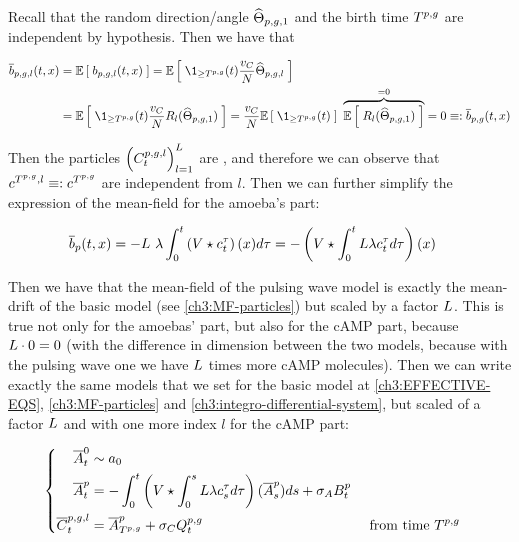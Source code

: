 Recall that the random direction/angle $\widehat{\Theta}_{p,g,1}$ and the birth time $T^{p,g}$ are independent by hypothesis.
Then we have that

\begin{align*}
	\mfdrift_{p,g,l} (t, x)  
	&=
	\E{\drift_{p,g,l} (t, x) }
	= 
	\E{
		\1_{\geq \btime^{p,g}}(t)  \frac{\cdrift}{N}  \cgonia_{p,g,l}
	} 
	\\
	&= 
	\E{
		\1_{\geq \btime^{p,g}}(t)  \frac{\cdrift}{N}  \rotation_l (\cgonia_{p,g,1}) 
	}
	=
	\frac{\cdrift}{N}  
	\E{
			\1_{\geq \btime^{p,g}}(t) 
	}\
	\overbrace{
		\E{ \rotation_l (\cgonia_{p,g,1}) }
	}^{=0} = 0 \equiv: \mfdrift_{p,g} (t, x)  
\end{align*}

Then the particles $\left(
C_t^{p,g,l}
\right)_{l =1}^L$
are \iid, and therefore we can observe that $c^{T^{p,g},l} \equiv: c^{T^{p,g}}$ are independent from $l$.
Then we can further simplify the expression of the mean-field for the amoeba's part:

\begin{equation*}
	\overline{b}_p (t, x) = 
	- L\
	\lambda \int_0^t
	\left( V \star c_t^{\tau} \right) (x)
	d \tau
	=
	- \left( 
	V \star \int_0^t L
	\lambda c_t^{\tau} d \tau
	\right) (x) 
	\quad
\end{equation*}

Then we have that the mean-field of the pulsing wave model is exactly the mean-drift of the basic model (see \ref{ch3:MF-particles}) but scaled by a factor $L$.
This is true not only for the amoebas' part, but also for the cAMP part, because $L\cdot 0 = 0$ (with the difference in dimension between the two models, because with the pulsing wave one we have $L$ times more cAMP molecules).
Then we can write exactly the same models that we set for the basic model at \ref{ch3:EFFECTIVE-EQS}, \ref{ch3:MF-particles} and \ref{ch3:integro-differential-system}, but scaled of a factor $L$ and with one more index $l$ for the cAMP part:

\begin{equation}\label{ch7:MF-PARTICLES}
	\left\{
	\begin{aligned}
		\overline{A}_t^0 &\sim a_0
		\\
		\overline{A}_t^p &= 
		- \int_0^t \left( 
		V \star \int_0^s L\lambda c_s^\tau 	d \tau
		\right) (\overline{A}_s^p) ds + \sigma_A B_t^p
		\\
		\overline{C}_t^{p,g,l} &= \overline{A}_{T^{p,g}}^p + \sigma_C Q_t^{p,g} &&\text{ from time }T^{p,g}
	\end{aligned}
	\right.
\end{equation}

